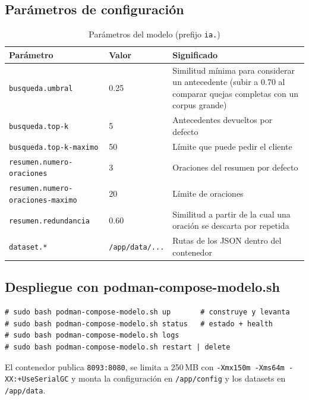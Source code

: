 \subsection{Parámetros de configuración}
\begin{table}[H]
\centering
\caption{Parámetros del modelo (prefijo \texttt{ia.})}
\begin{tabular}{llp{6.5cm}}
\toprule
\textbf{Parámetro} & \textbf{Valor} & \textbf{Significado} \\
\midrule
\texttt{busqueda.umbral} & 0.25 & Similitud mínima para considerar un antecedente (subir a 0.70 al comparar quejas completas con un corpus grande) \\
\texttt{busqueda.top-k} & 5 & Antecedentes devueltos por defecto \\
\texttt{busqueda.top-k-maximo} & 50 & Límite que puede pedir el cliente \\
\texttt{resumen.numero-oraciones} & 3 & Oraciones del resumen por defecto \\
\texttt{resumen.numero-oraciones-maximo} & 20 & Límite de oraciones \\
\texttt{resumen.redundancia} & 0.60 & Similitud a partir de la cual una oración se descarta por repetida \\
\texttt{dataset.*} & \texttt{/app/data/...} & Rutas de los JSON dentro del contenedor \\
\bottomrule
\end{tabular}
\end{table}

\subsection{Despliegue con podman-compose-modelo.sh}
\begin{lstlisting}
# sudo bash podman-compose-modelo.sh up       # construye y levanta
# sudo bash podman-compose-modelo.sh status   # estado + health
# sudo bash podman-compose-modelo.sh logs
# sudo bash podman-compose-modelo.sh restart | delete
\end{lstlisting}
El contenedor publica \texttt{8093:8080}, se limita a 250\,MB con \texttt{-Xmx150m -Xms64m -XX:+UseSerialGC} y monta la configuración en \texttt{/app/config} y los datasets en \texttt{/app/data}.

